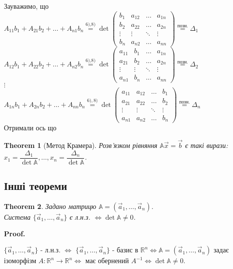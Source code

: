 \documentclass[a4paper, 10pt]{article}
\makeatletter
\def\qed{$\blacksquare$}
\theoremstyle{theoremdd}
\newtheorem{theorem}{Theorem}[subsection]
\theoremstyle{theoremdd}
\theoremstyle{theoremdd}
\theoremstyle{theoremdd}
\theoremstyle{theoremdd}
\theoremstyle{theoremdd}
\theoremstyle{theoremdd}
\theoremstyle{theoremdd}
\renewenvironment{proof}[1][Proof.\\]{\par
\pushQED{\hfill \qed}%
\normalfont \topsep6\p@\@plus6\p@\relax
\trivlist
\item\relax
{\bfseries
#1\@addpunct{.}}\hspace\labelsep\ignorespaces
}{%
\popQED\endtrivlist\@endpefalse
}
\makeatother
\begin{document}
Зауважимо, що\\
$A_{11}b_1 + A_{21}b_2 + \dots + A_{n1}b_n \overset{\textrm{6),8)}}{=} \det \begin{pmatrix}
b_1  & a_{12} & \dots & a_{1n} \\
b_2 & a_{22} & \dots & a_{2n} \\
\vdots & \vdots & \ddots & \vdots \\
b_n & a_{n2} & \dots & a_{nn}
\end{pmatrix} \overset{\text{позн.}}{=} \Delta_1$\\
$A_{12}b_1 + A_{22}b_2 + \dots + A_{n2}b_n \overset{\textrm{6),8)}}{=} \det \begin{pmatrix}
a_{11}  & b_1 & \dots & a_{1n} \\
a_{21} & b_2 & \dots & a_{2n} \\
\vdots & \vdots & \ddots & \vdots \\
a_{n1} & b_n & \dots & a_{nn}
\end{pmatrix} \overset{\text{позн.}}{=} \Delta_2$\\
$\vdots$\\
$A_{1n}b_1 + A_{2n}b_2 + \dots + A_{nn}b_n \overset{6),8)}{=} \det \begin{pmatrix}
a_{11}  & a_{12} & \dots & b_1 \\
a_{21} & a_{22} & \dots & b_2 \\
\vdots & \vdots & \ddots & \vdots \\
a_{n1} & a_{n2} & \dots & b_n
\end{pmatrix} \overset{\text{позн.}}{=} \Delta_n$\\
Отримали ось що
\begin{theorem}[Метод Крамера]
Розв'язком рівняння $\mathbb{A} \vec{x} = \vec{b}$ є такі вирази: $x_1 = \dfrac{\Delta_1}{\det \mathbb{A}}, \dots, x_n = \dfrac{\Delta_n}{\det \mathbb{A}}$.
\end{theorem}

\subsection{Інші теореми}
\begin{theorem}
Задано матрицю $\mathbb{A} = (\vec{a}_1,\dots,\vec{a}_n)$.\\
Система $\{\vec{a}_1, \dots, \vec{a}_n\}$ є л.н.з. $\iff \det \mathbb{A} \neq 0$.
\end{theorem}

\begin{proof}
$\{\vec{a}_1,\dots,\vec{a}_n\}$ - л.н.з. $\iff$ $\{\vec{a}_1,\dots,\vec{a}_n\}$ - базис в $\mathbb{R}^n \iff \mathbb{A} = (\vec{a}_1,\dots,\vec{a}_n)$ задає ізоморфізм $A: \mathbb{R}^n \to \mathbb{R}^n \iff$ має обернений $A^{-1} \iff \det \mathbb{A} \neq 0$.
\end{proof}
\end{document}
